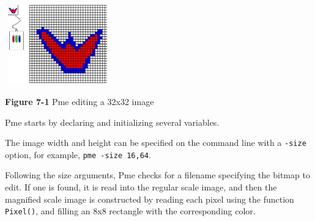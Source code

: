 \begin{center}
\includegraphics[width=1.7917in,height=1.3575in]{ub-img/ub-img11.jpg}
\end{center}

{\sffamily\bfseries Figure 7-1}
{\sffamily Pme editing a 32x32 image}

\bigskip

Pme starts by declaring and initializing several variables.

\bigskip


The image width and height can be specified on the command line with a
\texttt{-size} option, for example, \texttt{pme -size 16,64}.


Following the size arguments, Pme checks for a filename specifying the
bitmap to edit. If one is found, it is read into the regular scale
image, and then the magnified scale image is constructed by reading
each pixel using the function \texttt{Pixel()}, and filling an 8x8
rectangle with the corresponding color.

